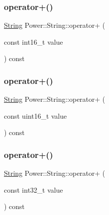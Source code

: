 \mbox{\label{class_power_1_1_string_ad650c3d76fd2ff718f2ee0dd6b9945de}} 
\subsubsection{\texorpdfstring{operator+()}{operator+()}\hspace{0.1cm}{\footnotesize\ttfamily [4/11]}}
{\footnotesize\ttfamily \hyperlink{class_power_1_1_string}{String} Power\+::\+String\+::operator+ (\begin{DoxyParamCaption}\item[{const int16\+\_\+t}]{value }\end{DoxyParamCaption}) const\hspace{0.3cm}{\ttfamily [inline]}}

\mbox{\label{class_power_1_1_string_a6efb41ecb5b26be77e91fba85a286538}} 
\subsubsection{\texorpdfstring{operator+()}{operator+()}\hspace{0.1cm}{\footnotesize\ttfamily [5/11]}}
{\footnotesize\ttfamily \hyperlink{class_power_1_1_string}{String} Power\+::\+String\+::operator+ (\begin{DoxyParamCaption}\item[{const uint16\+\_\+t}]{value }\end{DoxyParamCaption}) const\hspace{0.3cm}{\ttfamily [inline]}}

\mbox{\label{class_power_1_1_string_ac2eab190a121d5b7dc4431ea22966b7e}} 
\subsubsection{\texorpdfstring{operator+()}{operator+()}\hspace{0.1cm}{\footnotesize\ttfamily [6/11]}}
{\footnotesize\ttfamily \hyperlink{class_power_1_1_string}{String} Power\+::\+String\+::operator+ (\begin{DoxyParamCaption}\item[{const int32\+\_\+t}]{value }\end{DoxyParamCaption}) const\hspace{0.3cm}{\ttfamily [inline]}}

